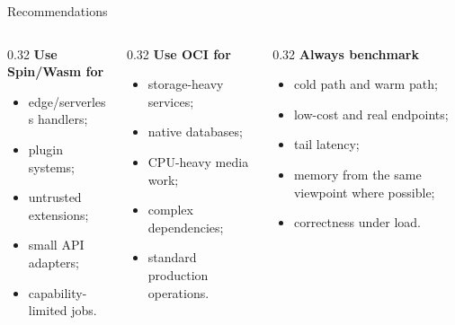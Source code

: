 \documentclass[aspectratio=169,10pt]{beamer}
\begin{document}
\begin{frame}{Recommendations}
  \begin{columns}[T,onlytextwidth]
    \begin{column}{0.32\linewidth}
      \textbf{Use Spin/Wasm for}
      \begin{itemize}
        \item edge/serverless handlers;
        \item plugin systems;
        \item untrusted extensions;
        \item small API adapters;
        \item capability-limited jobs.
      \end{itemize}
    \end{column}
    \begin{column}{0.32\linewidth}
      \textbf{Use OCI for}
      \begin{itemize}
        \item storage-heavy services;
        \item native databases;
        \item CPU-heavy media work;
        \item complex dependencies;
        \item standard production operations.
      \end{itemize}
    \end{column}
    \begin{column}{0.32\linewidth}
      \textbf{Always benchmark}
      \begin{itemize}
        \item cold path and warm path;
        \item low-cost and real endpoints;
        \item tail latency;
        \item memory from the same viewpoint where possible;
        \item correctness under load.
      \end{itemize}
    \end{column}
  \end{columns}
\end{frame}
\end{document}
